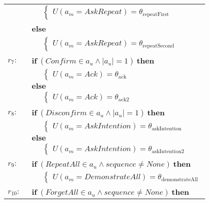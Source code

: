 \begin{footnotesize}
\begin{longtable}{p{1cm}l}
& $\;\;\;\;\; \begin{cases}U(\mathit{a_m}\!=\!\mathit{AskRepeat})\!=\!\theta_{\mathrm{repeatFirst}}\end{cases}$ \\ & \textbf{else} \\
& $\;\;\;\;\; \begin{cases}U(\mathit{a_m}\!=\!\mathit{AskRepeat})\!=\!\theta_{\mathrm{repeatSecond}}\end{cases}$ \\ \\[-1mm]
$r_{7}: \ \ $& $\textbf{if} \ (\mathit{Confirm}\!\in\!\mathit{a_u} \land \mathit{|a_u|}\!=\!\mathit{1}) \ \textbf{then}$ \\
& $\;\;\;\;\; \begin{cases}U(\mathit{a_m}\!=\!\mathit{Ack})\!=\!\theta_{\mathrm{ack}}\end{cases}$ \\ 
& $\textbf{else}$ \\
& $\;\;\;\;\; \begin{cases}U(\mathit{a_m}\!=\!\mathit{Ack})\!=\!\theta_{\mathrm{ack2}}\end{cases}$ \\ \\[-1mm]
$r_{8}: \ \ $& $\textbf{if} \ (\mathit{Disconfirm}\!\in\!\mathit{a_u} \land \mathit{|a_u|}\!=\!\mathit{1}) \ \textbf{then}$ \\
& $\;\;\;\;\; \begin{cases}U(\mathit{a_m}\!=\!\mathit{AskIntention})\!=\!\theta_{\mathrm{askIntention}}\end{cases}$ \\ 
& $\textbf{else}$ \\
& $\;\;\;\;\; \begin{cases}U(\mathit{a_m}\!=\!\mathit{AskIntention})\!=\!\theta_{\mathrm{askIntention2}}\end{cases}$\\ \\[-1mm]
$r_{9}: \ \ $& $\textbf{if} \ (\mathit{RepeatAll}\!\in\!\mathit{a_u} \land \mathit{sequence}\!\neq\!\mathit{None}) \ \textbf{then}$ \\
& $\;\;\;\;\; \begin{cases}U(\mathit{a_m}\!=\!\mathit{DemonstrateAll})\!=\!\theta_{\mathrm{demonstrateAll}}\end{cases}$\\ \\[-1mm]
$r_{10}: \ \ $& $\textbf{if} \ (\mathit{ForgetAll}\!\in\!\mathit{a_u} \land \mathit{sequence}\!\neq\!\mathit{None}) \ \textbf{then}$ \\

\end{longtable}
\end{footnotesize}
